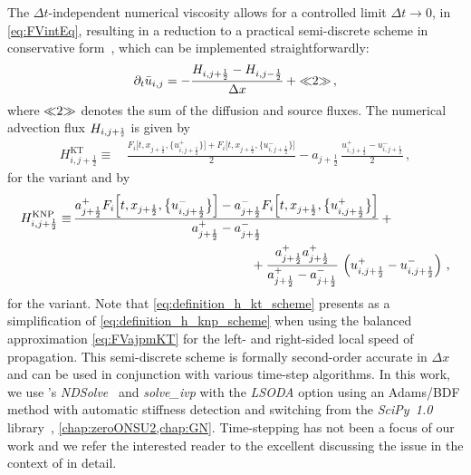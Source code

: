 The $\Delta t$-independent numerical viscosity allows for a controlled limit $\Delta t \rightarrow 0$, in \cref{eq:FVintEq}, resulting in a reduction to a practical semi-discrete scheme in conservative form~\cite{KTO2-0}, which can be implemented straightforwardly:
\begin{align}
	\partial_t \bar{u}_{i,j} = - \frac{H_{i,j + \frac{1}{2}} - H_{i,j - \frac{1}{2}}}{\Delta x}\, + \skeleton{2} \, ,	\label{eq:FVKTO2H}
\end{align}
where $\skeleton{2}$ denotes the sum of the diffusion and source fluxes.
The numerical advection flux $H_{i,j + \ttfrac{1}{2}}$ is given by
	\begin{align}
		H_{i,j + \frac{1}{2}}^\mathrm{KT} \equiv \, & \frac{F_i \Big[ t, x_{j + \frac{1}{2}}, \big\{u_{i,j + \frac{1}{2}}^+\big\} \Big] + F_i \Big[ t, x_{j + \frac{1}{2}}, \big\{u_{i,j + \frac{1}{2}}^-\big\} \Big]}{2} - a_{j + \frac{1}{2}} \, \frac{u_{i,j + \frac{1}{2}}^{+} - u_{i,j + \frac{1}{2}}^{-}}{2} \, ,	\label{eq:definition_h_kt_scheme}
	\end{align}
for the \kt{} variant and by
\begin{align}
	H_{i,j + \frac{1}{2}}^\mathrm{KNP} \equiv \, & \frac{a_{j + \frac{1}{2}}^+ F_i \Big[ t, x_{j + \frac{1}{2}}, \big\{u_{i,j + \frac{1}{2}}^-\big\} \Big] - a_{j + \frac{1}{2}}^- F_i \Big[ t, x_{j + \frac{1}{2}}, \big\{u_{i,j + \frac{1}{2}}^+\big\} \Big]}{a_{j + \frac{1}{2}}^+-a_{j + \frac{1}{2}}^-}\,+ \notag\\* %
	&\qquad\qquad\qquad\qquad\qquad\qquad\qquad+ \frac{a_{j + \frac{1}{2}}^+a_{j + \frac{1}{2}}^+}{a_{j + \frac{1}{2}}^+-a_{j + \frac{1}{2}}^-} \,\del{u_{i,j + \frac{1}{2}}^{+} - u_{i,j + \frac{1}{2}}^{-}} \, ,	\label{eq:definition_h_knp_scheme}
\end{align}
for the \knp{} variant.
Note that \cref{eq:definition_h_kt_scheme} presents as a simplification of \cref{eq:definition_h_knp_scheme} when using the balanced approximation \eqref{eq:FVajpmKT} for the left- and right-sided local speed of propagation.
This semi-discrete scheme is formally second-order accurate in $\Delta x$ and can be used in conjunction with various \ode{} time-step algorithms.
In this work, we use \WAM{}'s \textit{NDSolve}~\cite{Mathematica:12.1,Mathematica:13.0} and \textit{solve\_ivp} with the \textit{LSODA} option using an Adams/BDF method with automatic stiffness detection and switching from the \textit{SciPy~1.0} library~\cite{2020SciPy-NMeth}, \cf{} \cref{chap:zeroONSU2,chap:GN}.
Time-stepping has not been a focus of our work and we refer the interested reader to the excellent  discussing the issue in the context of \frg{} in detail.

